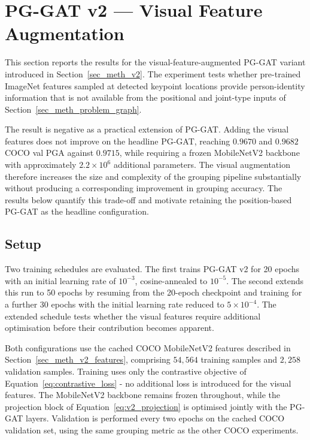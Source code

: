 \section{PG-GAT v2 --- Visual Feature Augmentation}
\label{sec_res_v2}

This section reports the results for the visual-feature-augmented
PG-GAT variant introduced in Section~\ref{sec_meth_v2}.
The experiment tests whether pre-trained ImageNet features sampled
at detected keypoint locations provide person-identity information
that is not available from the positional and joint-type inputs
of Section~\ref{sec_meth_problem_graph}.

The result is negative as a practical extension of PG-GAT.
Adding the visual features does not improve on the headline PG-GAT,
reaching $0.9670$ and $0.9682$ COCO val PGA against $0.9715$,
while requiring a frozen MobileNetV2 backbone with approximately
$2.2 \times 10^{6}$ additional parameters.
The visual augmentation therefore increases the size and complexity
of the grouping pipeline substantially
without producing a corresponding improvement in grouping accuracy.
The results below quantify this trade-off
and motivate retaining the position-based PG-GAT as the headline
configuration.

\subsection{Setup}
\label{sec_res_v2_setup}

Two training schedules are evaluated.
The first trains PG-GAT v2 for 20 epochs with an initial learning rate
of $10^{-3}$,
cosine-annealed to $10^{-5}$.
The second extends this run to 50 epochs by resuming from the 20-epoch
checkpoint
and training for a further 30 epochs with the initial learning rate
reduced to $5 \times 10^{-4}$.
The extended schedule tests whether the visual features require
additional optimisation before their contribution becomes apparent.

Both configurations use the cached COCO MobileNetV2 features described
in Section~\ref{sec_meth_v2_features},
comprising $54{,}564$ training samples and $2{,}258$ validation samples.
Training uses only the contrastive objective of
Equation~\eqref{eq:contrastive_loss} -
no additional loss is introduced for the visual features.
The MobileNetV2 backbone remains frozen throughout,
while the projection block of Equation~\eqref{eq:v2_projection}
is optimised jointly with the PG-GAT layers.
Validation is performed every two epochs on the cached COCO validation set,
using the same grouping metric as the other COCO experiments.

